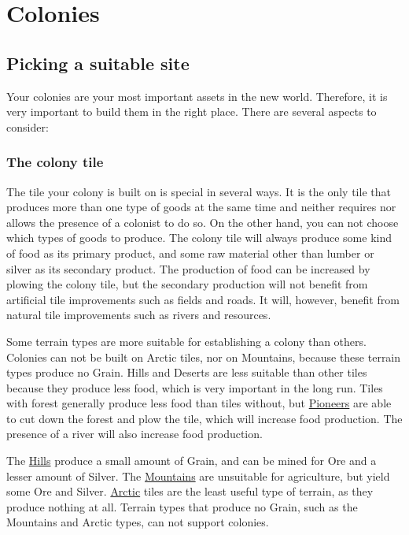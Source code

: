 \documentclass[12pt]{book}
\begin{document}
\hypertarget{Colonies}{\chapter{Colonies}}

\hypertarget{Picking a suitable site}{\section{Picking a suitable site}}

Your colonies are your most important assets in the new world.
Therefore, it is very important to build them in the right
place. There are several aspects to consider:

\hypertarget{The colony tile}{\subsection{The colony tile}}

The tile your colony is built on is special in several ways. It is the
only tile that produces more than one type of goods at the same time
and neither requires nor allows the presence of a colonist to do
so. On the other hand, you can not choose which types of goods to
produce. The colony tile will always produce some kind of food as its
primary product, and some raw material other than lumber or silver as
its secondary product. The production of food can be increased by
plowing the colony tile, but the secondary production will not benefit
from artificial tile improvements such as fields and roads. It will,
however, benefit from natural tile improvements such as rivers and
resources.

Some terrain types are more suitable for establishing a colony than
others. Colonies can not be built on Arctic tiles, nor on Mountains,
because these terrain types produce no Grain. Hills and Deserts are
less suitable than other tiles because they produce less food, which
is very important in the long run. Tiles with forest generally produce
less food than tiles without, but \hyperlink{Pioneer}{Pioneers} are
able to cut down the forest and plow the tile, which will increase
food production. The presence of a river will also increase food
production.

The \hyperlink{Hills}{Hills} produce a small amount of Grain, and can
be mined for Ore and a lesser amount of Silver. The
\hyperlink{Mountains}{Mountains} are unsuitable for agriculture, but
yield some Ore and Silver. \hyperlink{Arctic}{Arctic} tiles are the
least useful type of terrain, as they produce nothing at all. Terrain
types that produce no Grain, such as the Mountains and Arctic types,
can not support colonies.
\end{document}
